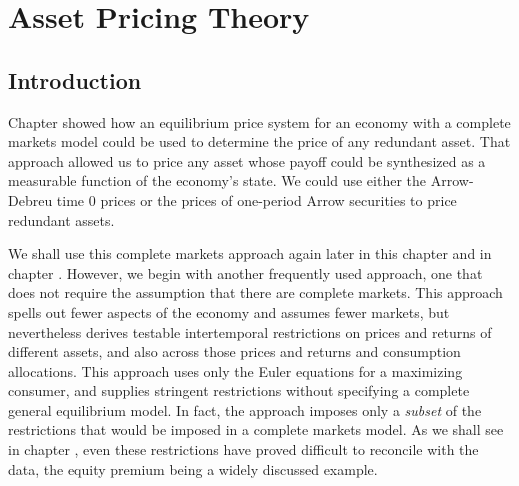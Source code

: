 




\def\bbR{{I\kern-0.3em R}}

\def\epigraph#1#2{%
\begingroup
\smallskip
\leftskip=2em
\rightskip=0pt plus2em
\it\noindent #1\par
\noindent --- #2\par
\endgroup\noindent}

\def\tone{{t+1}}
\def\toner{{t-1}}
\def\pdp{{{p_{t+1}+d_{t+1}\over p_t}}}
\def\ucuc{{{u'(c_{t+1})\over u'(c_t)}}}
\def\ucucc{{{u'(c_{t+2})\over u'(c_t)}}}
\def\cov{{\rm cov}}
\chapter{Asset Pricing Theory\label{assetpricing1}}

\section{Introduction}

    Chapter  showed how an equilibrium price system
for an economy with a complete markets model could be used to
determine the  price  of any redundant asset.  That approach
allowed us to price any asset whose payoff could be synthesized
as a measurable function of the economy's state.  We could use
either the Arrow-Debreu time $0$ prices or the prices of
one-period Arrow securities to price  redundant assets.

  We shall use this
complete markets approach again later in this chapter and in chapter .
However, we begin with another frequently used approach, one
that does not require the assumption that there are complete markets.
This approach spells out fewer aspects of the economy and
assumes fewer markets, but nevertheless
derives testable intertemporal restrictions on prices and returns
of different assets, and also across those prices and returns
and consumption allocations.  This approach uses
only the Euler equations for a maximizing consumer,
and supplies stringent restrictions
without specifying a complete  general equilibrium model.
In fact, the approach
imposes only a {\it subset\/} of the restrictions that
would be imposed in a complete markets  model.  As we
shall see in chapter , even these restrictions have proved difficult to
reconcile with the data, the equity premium
being a widely discussed example.

